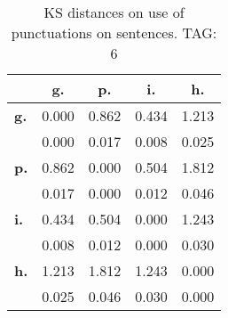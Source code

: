 \begin{table}[h!]
\begin{center}
\begin{tabular}{| l || c | c | c | c |}\hline
 & {\bf g.} & {\bf p.} & {\bf i.} & {\bf h.} \\\hline\hline
{\bf g.} & 0.000 & 0.862 & 0.434 & 1.213 \\
{\bf } & 0.000 & 0.017 & 0.008 & 0.025 \\\hline
{\bf p.} & 0.862 & 0.000 & 0.504 & 1.812 \\
{\bf } & 0.017 & 0.000 & 0.012 & 0.046 \\\hline
{\bf i.} & 0.434 & 0.504 & 0.000 & 1.243 \\
{\bf } & 0.008 & 0.012 & 0.000 & 0.030 \\\hline
{\bf h.} & 1.213 & 1.812 & 1.243 & 0.000 \\
{\bf } & 0.025 & 0.046 & 0.030 & 0.000 \\\hline
\end{tabular}
\caption{KS distances on use of punctuations on sentences. TAG: 6}
\end{center}
\end{table}